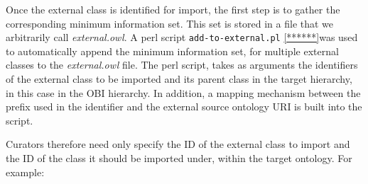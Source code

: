 \documentclass[a4paper,10pt,twocolumn]{article}
\newcommand{\protege}{Prot\'{e}g\'{e}}
\begin{document}

Once the external class is identified for import, the first step is to gather the corresponding minimum information set.
This set is stored in a file that we arbitrarily call \emph{external.owl}.
A perl script \texttt{add-to-external.pl} \ref{******}was used to automatically append the minimum information set, for multiple external classes to the \emph{external.owl} file. The perl script, takes as arguments the identifiers of the external class to be imported and its parent class in the target hierarchy, in this case in the \ac{OBI} hierarchy. 
In addition, a mapping mechanism between the prefix used in the identifier and the external source ontology URI is built into the script.







Curators therefore need only specify the ID of the external class to import and the ID of the class it should be imported under, within the target ontology.
For example:
\end{document}
